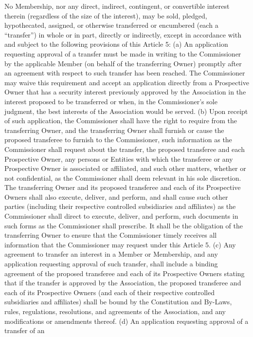 \documentclass[]{book}
\theoremstyle{definition}
\theoremstyle{definition}
\theoremstyle{definition}
\theoremstyle{remark}
\begin{document}
No Membership, nor any direct, indirect, contingent, or convertible
interest therein (regardless of the size of the interest), may be sold,
pledged, hypothecated, assigned, or otherwise transferred or encumbered
(each a ``transfer'') in whole or in part, directly or indirectly,
except in accordance with and subject to the following provisions of
this Article 5: (a) An application requesting approval of a transfer
must be made in writing to the Commissioner by the applicable Member (on
behalf of the transferring Owner) promptly after an agreement with
respect to such transfer has been reached. The Commissioner may waive
this requirement and accept an application directly from a Prospective
Owner that has a security interest previously approved by the
Association in the interest proposed to be transferred or when, in the
Commissioner's sole judgment, the best interests of the Association
would be served. (b) Upon receipt of such application, the Commissioner
shall have the right to require from the transferring Owner, and the
transferring Owner shall furnish or cause the proposed transferee to
furnish to the Commissioner, such information as the Commissioner shall
request about the transfer, the proposed transferee and each Prospective
Owner, any persons or Entities with which the transferee or any
Prospective Owner is associated or affiliated, and such other matters,
whether or not confidential, as the Commissioner shall deem relevant in
his sole discretion. The transferring Owner and its proposed transferee
and each of its Prospective Owners shall also execute, deliver, and
perform, and shall cause such other parties (including their respective
controlled subsidiaries and affiliates) as the Commissioner shall direct
to execute, deliver, and perform, such documents in such forms as the
Commissioner shall prescribe. It shall be the obligation of the
transferring Owner to ensure that the Commissioner timely receives all
information that the Commissioner may request under this Article 5. (c)
Any agreement to transfer an interest in a Member or Membership, and any
application requesting approval of such transfer, shall include a
binding agreement of the proposed transferee and each of its Prospective
Owners stating that if the transfer is approved by the Association, the
proposed transferee and each of its Prospective Owners (and each of
their respective controlled subsidiaries and affiliates) shall be bound
by the Constitution and By-Laws, rules, regulations, resolutions, and
agreements of the Association, and any modifications or amendments
thereof. (d) An application requesting approval of a transfer of an
\end{document}
